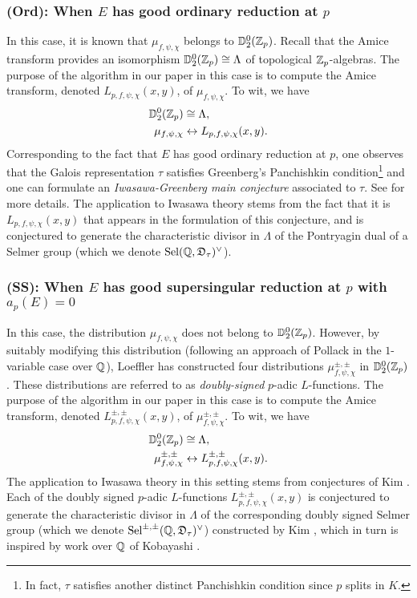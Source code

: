 \documentclass[a4paper,11pt]{article}
\numberwithin{equation}{section}
\newcommand{\Sel}{\mathrm{Sel}}
\newcommand{\DDD}{\mathfrak{D}}
\begin{document}
\subsubsection*{(Ord): When $E$ has good ordinary reduction at $p$} In this case, it is known that ${\mu}_{f,\psi,\chi}$ belongs to $\mathbb{D}_2^0(\mathbb{Z}_p)$. Recall that the Amice transform provides an  isomorphism $\mathbb{D}_2^0(\mathbb{Z}_p) \cong \Lambda$ of topological $\mathbb{Z}_p$-algebras. The purpose of the algorithm in our paper in this case is to compute the Amice transform, denoted $L_{p,f,\psi,\chi}(x,y)$, of $\mu_{f,\psi,\chi}$. To wit, we have
\begin{align*}
\mathbb{D}_2^0(\mathbb{Z}_p) &\cong \Lambda, \\
\mu_{f,\psi,\chi} &\leftrightarrow L_{p,f,\psi,\chi}(x,y).
\end{align*}
Corresponding to the fact that $E$ has good ordinary reduction at $p$, one observes that the Galois representation $\tau$ satisfies Greenberg's Panchishkin condition\footnote{In fact, $\tau$ satisfies another distinct Panchishkin condition since $p$ splits in $K$.} and one can formulate an \textit{Iwasawa-Greenberg main conjecture} associated to $\tau$. See \cite{MR1265554} for more details. The application to Iwasawa theory stems from the fact that it is $L_{p,f,\psi,\chi}(x,y)$ that appears in the formulation of this conjecture, and is conjectured to generate the characteristic divisor in $\Lambda$ of the Pontryagin dual of a Selmer group (which we denote $\Sel(\Q,\DDD_\tau)^\vee$).

\subsubsection*{(SS): When $E$ has good supersingular reduction at $p$ with $a_p(E)=0$} In this case, the distribution $\mu_{f,\psi,\chi}$ does not belong to $\mathbb{D}_2^0(\mathbb{Z}_p)$. However, by suitably modifying this distribution (following an approach of Pollack \cite{MR1983040} in the $1$-variable case over $\mathbb{Q}$), Loeffler \cite{Loe14} has constructed four distributions $\mu^{\pm,\pm}_{f,\psi,\chi}$ in $\mathbb{D}_2^0(\mathbb{Z}_p)$. These distributions are referred to as \textit{doubly-signed} $p$-adic $L$-functions.  The purpose of the algorithm in our paper in this case is to compute the Amice transform, denoted $L^{\pm,\pm}_{p,f,\psi,\chi}(x,y)$, of $\mu^{\pm,\pm}_{f,\psi,\chi}$. To wit, we have
\begin{align*}
\mathbb{D}_2^0(\mathbb{Z}_p) &\cong \Lambda, \\
\mu^{\pm,\pm}_{f,\psi,\chi} &\leftrightarrow L^{\pm,\pm}_{p,f,\psi,\chi}(x,y).
\end{align*}
The application to Iwasawa theory in this setting stems from conjectures of Kim \cite{MR3224266}. Each of the doubly signed $p$-adic $L$-functions $L^{\pm,\pm}_{p,f,\psi,\chi}(x,y)$ is conjectured to generate the characteristic divisor in $\Lambda$ of the corresponding doubly signed Selmer group (which we denote $\Sel^{\pm,\pm}(\Q,\DDD_\tau)^\vee$) constructed by Kim \cite{MR3224266}, which in turn is inspired by work over $\mathbb{Q}$ of Kobayashi \cite{MR1965358}.
\end{document}
